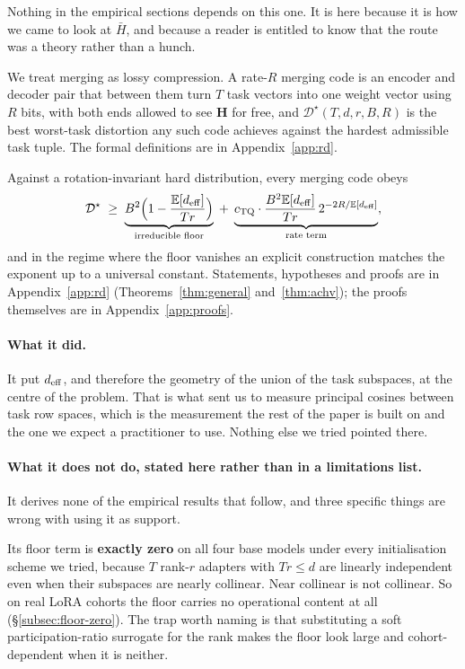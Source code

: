 Nothing in the empirical sections depends on this one. It is here because it
is how we came to look at $\bar H$, and because a reader is entitled to know
that the route was a theory rather than a hunch.

We treat merging as lossy compression. A rate-$R$ merging code is an encoder
and decoder pair that between them turn $T$ task vectors into one weight
vector using $R$ bits, with both ends allowed to see $\boldsymbol H$ for free,
and $\mathcal{D}^\star(T,d,r,B,R)$ is the best worst-task distortion any such
code achieves against the hardest admissible task tuple. The formal
definitions are in Appendix~\ref{app:rd}.

Against a rotation-invariant hard distribution, every merging code obeys
\begin{equation}\label{eq:bound-brief}
  \mathcal{D}^\star
  \;\geq\;
  \underbrace{B^2\Bigl(1 - \frac{\mathbb{E}[d_{\mathrm{eff}}]}{Tr}\Bigr)}_{\text{irreducible floor}}
  \;+\;
  \underbrace{c_{\mathrm{TQ}}\cdot\frac{B^2\mathbb{E}[d_{\mathrm{eff}}]}{Tr}\,
  2^{-2R/\mathbb{E}[d_{\mathrm{eff}}]}}_{\text{rate term}},
\end{equation}
and in the regime where the floor vanishes an explicit construction matches
the exponent up to a universal constant. Statements, hypotheses and proofs are
in Appendix~\ref{app:rd} (Theorems~\ref{thm:general} and~\ref{thm:achv}); the
proofs themselves are in Appendix~\ref{app:proofs}.

\paragraph{What it did.} It put $d_{\mathrm{eff}}$, and therefore the geometry of the
union of the task subspaces, at the centre of the problem. That is what sent
us to measure principal cosines between task row spaces, which is the
measurement the rest of the paper is built on and the one we expect a
practitioner to use. Nothing else we tried pointed there.

\paragraph{What it does not do, stated here rather than in a limitations
list.} It derives none of the empirical results that follow, and three
specific things are wrong with using it as support.

Its floor term is \textbf{exactly zero} on all four base models under every
initialisation scheme we tried, because $T$ rank-$r$ adapters with $Tr \leq d$
are linearly independent even when their subspaces are nearly collinear. Near
collinear is not collinear. So on real LoRA cohorts the floor carries no
operational content at all (\S\ref{subsec:floor-zero}). The trap worth
naming is that substituting a soft participation-ratio surrogate for the
rank makes the floor look large and cohort-dependent when it is neither.

